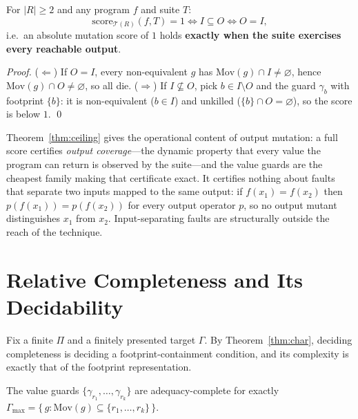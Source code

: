 \documentclass[runningheads,envcountsect,envcountsame]{llncs}
\newcommand{\Mov}{\mathrm{Mov}}
\newcommand{\score}{\mathrm{score}}
\newcommand{\TR}{\mathcal{T}(R)}
\begin{document}
\begin{theorem}
\label{thm:ceiling}
For $|R| \ge 2$ and any program $f$ and suite $T$:
\[
  \score_{\TR}(f,T) = 1 \iff I \subseteq O \iff O = I,
\]
i.e.\ an absolute mutation score of $1$ holds \textbf{exactly when the suite
exercises every reachable output}.
\end{theorem}

\begin{proof}
($\Leftarrow$) If $O = I$, every non-equivalent $g$ has
$\Mov(g) \cap I \neq \varnothing$, hence $\Mov(g) \cap O \neq \varnothing$, so
all die. ($\Rightarrow$) If $I \not\subseteq O$, pick $b \in I \setminus O$ and
the guard $\gamma_b$ with footprint $\{b\}$: it is non-equivalent ($b \in I$) and
unkilled ($\{b\} \cap O = \varnothing$), so the score is below $1$. \qed
\end{proof}

\begin{remark}
\label{rem:ceiling}
Theorem~\ref{thm:ceiling} gives the operational content of output mutation: a
full score certifies \emph{output coverage}---the dynamic property that every
value the program can return is observed by the suite---and the value guards are
the cheapest family making that certificate exact. It certifies nothing about
faults that separate two inputs mapped to the same output: if $f(x_1) = f(x_2)$
then $p(f(x_1)) = p(f(x_2))$ for every output operator $p$, so no output mutant
distinguishes $x_1$ from $x_2$. Input-separating faults are structurally outside
the reach of the technique.
\end{remark}

\section{Relative Completeness and Its Decidability}
\label{sec:relative}

Fix a finite $\Pi$ and a finitely presented target $\Gamma$. By
Theorem~\ref{thm:char}, deciding completeness is deciding a footprint-containment
condition, and its complexity is exactly that of the footprint representation.

\begin{proposition}
\label{prop:reach}
The value guards $\{\gamma_{r_1},\dots,\gamma_{r_k}\}$ are adequacy-complete for
exactly
$\Gamma_{\max} = \{\, g : \Mov(g) \subseteq \{r_1,\dots,r_k\} \,\}$.
\end{proposition}
\end{document}
